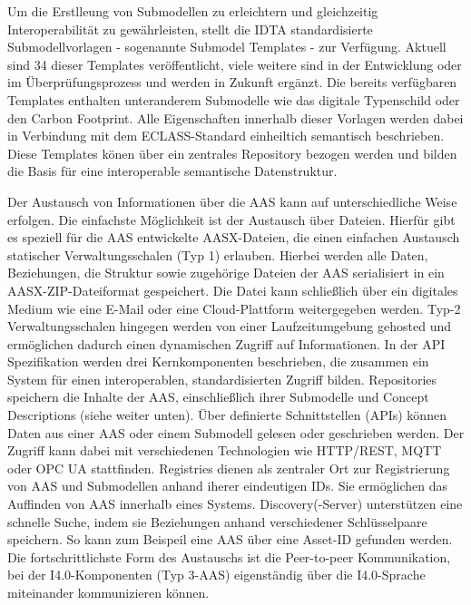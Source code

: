 Um die Erstlleung von Submodellen zu erleichtern und gleichzeitig Interoperabilität zu gewährleisten, stellt die IDTA standardisierte Submodellvorlagen - sogenannte Submodel Templates - zur Verfügung.
Aktuell sind 34 dieser Templates veröffentlicht, viele weitere sind in der Entwicklung oder im Überprüfungsprozess und werden in Zukunft ergänzt.
Die bereits verfügbaren Templates enthalten unteranderem Submodelle wie das digitale Typenschild oder den Carbon Footprint.
Alle Eigenschaften innerhalb dieser Vorlagen werden dabei in Verbindung mit dem ECLASS-Standard einheiltich semantisch beschrieben.
Diese Templates könen über ein zentrales Repository bezogen werden und bilden die Basis für eine interoperable semantische Datenstruktur.

Der Austausch von Informationen über die AAS kann auf unterschiedliche Weise erfolgen.
Die einfachste Möglichkeit ist der Austausch über Dateien. Hierfür gibt es speziell für die AAS entwickelte AASX-Dateien, die einen einfachen Austausch statischer Verwaltungsschalen (Typ 1) erlauben. \cite{SpezifikationPart5}
Hierbei werden alle Daten, Beziehungen, die Struktur sowie zugehörige Dateien der AAS serialisiert in ein AASX-ZIP-Dateiformat gespeichert. Die Datei kann schließlich über ein digitales Medium wie eine E-Mail oder eine Cloud-Plattform weitergegeben werden.  
Typ-2 Verwaltungsschalen hingegen werden von einer Laufzeitumgebung gehosted und ermöglichen dadurch einen dynamischen Zugriff auf Informationen. 
In der API Spezifikation werden drei Kernkomponenten beschrieben, die zusammen ein System für einen interoperablen, standardisierten Zugriff bilden. \cite{SpezifikationPart2}
Repositories speichern die Inhalte der AAS, einschließlich ihrer Submodelle und Concept Descriptions (siehe weiter unten).
Über definierte Schnittstellen (APIs) können Daten aus einer AAS oder einem Submodell gelesen oder geschrieben werden.
Der Zugriff kann dabei mit verschiedenen Technologien wie HTTP/REST, MQTT oder OPC UA stattfinden.
Registries dienen als zentraler Ort zur Registrierung von AAS und Submodellen anhand iherer eindeutigen IDs. Sie ermöglichen das Auffinden von AAS innerhalb eines Systems.
Discovery(-Server) unterstützen eine schnelle Suche, indem sie Beziehungen anhand verschiedener Schlüsselpaare speichern. So kann zum Beispeil eine AAS über eine Asset-ID gefunden werden. 
Die fortschrittlichste Form des Austauschs ist die Peer-to-peer Kommunikation, bei der I4.0-Komponenten (Typ 3-AAS) eigenständig über die I4.0-Sprache miteinander kommunizieren können.

